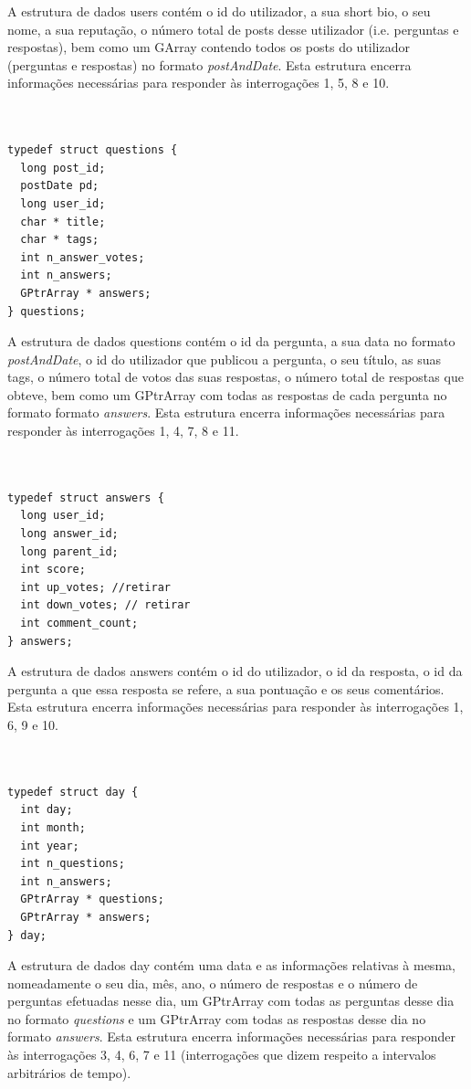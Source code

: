 \documentclass[a4paper]{report}
\begin{document}
A estrutura de dados users contém o id do utilizador, a sua short bio, o seu nome,
a sua reputação, o número total de posts desse utilizador (i.e. perguntas e respostas),
bem como um GArray contendo todos os posts do utilizador (perguntas e respostas) no
formato \textit{postAndDate}.
Esta estrutura encerra informações necessárias para responder às interrogações 1,
5, 8 e 10.

\begin{verbatim}


typedef struct questions {
  long post_id;
  postDate pd;
  long user_id;
  char * title;
  char * tags;
  int n_answer_votes;
  int n_answers;
  GPtrArray * answers;
} questions;

\end{verbatim}

A estrutura de dados questions contém o id da pergunta, a sua data no formato
\textit{postAndDate}, o id do utilizador que publicou a pergunta, o seu título,
as suas tags, o número total de votos das suas respostas, o número total de
respostas que obteve, bem como um GPtrArray com todas as respostas de cada
pergunta no formato formato \textit{answers}.
Esta estrutura encerra informações necessárias para responder às interrogações 1,
4, 7, 8 e 11.

\begin{verbatim}


typedef struct answers {
  long user_id;
  long answer_id;
  long parent_id;
  int score;
  int up_votes; //retirar
  int down_votes; // retirar
  int comment_count;
} answers;

\end{verbatim}

A estrutura de dados answers contém o id do utilizador, o id da resposta, o id da
pergunta a que essa resposta se refere, a sua pontuação e os seus comentários.
Esta estrutura encerra informações necessárias para responder às interrogações 1,
6, 9 e 10.

\begin{verbatim}


typedef struct day {
  int day;
  int month;
  int year;
  int n_questions;
  int n_answers;
  GPtrArray * questions;
  GPtrArray * answers;
} day;

\end{verbatim}

A estrutura de dados day contém uma data e as informações relativas à mesma,
nomeadamente o seu dia, mês, ano, o número de respostas e o
número de perguntas efetuadas nesse dia, um GPtrArray com todas as perguntas
desse dia no formato \textit{questions} e um GPtrArray com todas as respostas
desse dia no formato \textit{answers}. Esta estrutura encerra informações
necessárias para responder às interrogações 3, 4, 6, 7 e 11
(interrogações que dizem respeito a intervalos arbitrários de tempo).
\end{document}
